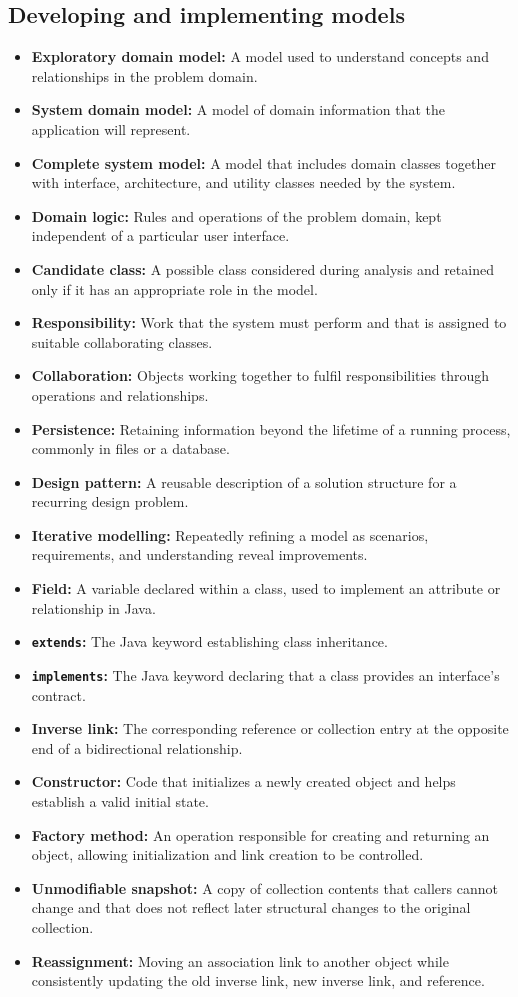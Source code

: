 \documentclass[11pt]{article}
\newenvironment{DottedList}{%
  \begin{itemize}[leftmargin=2em, itemsep=0.35em, topsep=0.35em, label=\textbullet]
}{%
  \end{itemize}
}
\begin{document}
\subsection*{Developing and implementing models}
\begin{DottedList}
  \item \textbf{Exploratory domain model:} A model used to understand concepts and relationships in the problem domain.
  \item \textbf{System domain model:} A model of domain information that the application will represent.
  \item \textbf{Complete system model:} A model that includes domain classes together with interface, architecture, and utility classes needed by the system.
  \item \textbf{Domain logic:} Rules and operations of the problem domain, kept independent of a particular user interface.
  \item \textbf{Candidate class:} A possible class considered during analysis and retained only if it has an appropriate role in the model.
  \item \textbf{Responsibility:} Work that the system must perform and that is assigned to suitable collaborating classes.
  \item \textbf{Collaboration:} Objects working together to fulfil responsibilities through operations and relationships.
  \item \textbf{Persistence:} Retaining information beyond the lifetime of a running process, commonly in files or a database.
  \item \textbf{Design pattern:} A reusable description of a solution structure for a recurring design problem.
  \item \textbf{Iterative modelling:} Repeatedly refining a model as scenarios, requirements, and understanding reveal improvements.
  \item \textbf{Field:} A variable declared within a class, used to implement an attribute or relationship in Java.
  \item \textbf{\texttt{extends}:} The Java keyword establishing class inheritance.
  \item \textbf{\texttt{implements}:} The Java keyword declaring that a class provides an interface's contract.
  \item \textbf{Inverse link:} The corresponding reference or collection entry at the opposite end of a bidirectional relationship.
  \item \textbf{Constructor:} Code that initializes a newly created object and helps establish a valid initial state.
  \item \textbf{Factory method:} An operation responsible for creating and returning an object, allowing initialization and link creation to be controlled.
  \item \textbf{Unmodifiable snapshot:} A copy of collection contents that callers cannot change and that does not reflect later structural changes to the original collection.
  \item \textbf{Reassignment:} Moving an association link to another object while consistently updating the old inverse link, new inverse link, and reference.
\end{DottedList}
\end{document}
